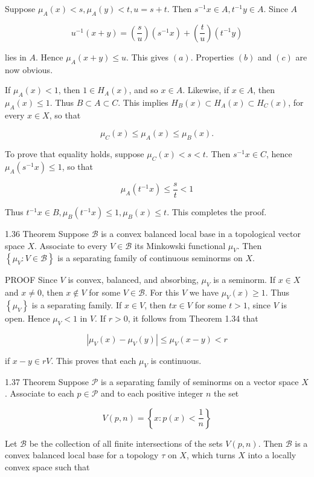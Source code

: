 \documentclass[10pt]{article}
\begin{document}
Suppose $\mu_{A}(x)<s, \mu_{A}(y)<t, u=s+t$. Then $s^{-1} x \in A, t^{-1} y \in A$. Since $A$

$$
u^{-1}(x+y)=\left(\frac{s}{u}\right)\left(s^{-1} x\right)+\left(\frac{t}{u}\right)\left(t^{-1} y\right)
$$

lies in $A$. Hence $\mu_{A}(x+y) \leq u$. This gives $(a)$. Properties $(b)$ and $(c)$ are now obvious.

If $\mu_{A}(x)<1$, then $1 \in H_{A}(x)$, and so $x \in A$. Likewise, if $x \in A$, then $\mu_{A}(x) \leq 1$. Thus $B \subset A \subset C$. This implies $H_{B}(x) \subset H_{A}(x) \subset H_{C}(x)$, for every $x \in X$, so that

$$
\mu_{C}(x) \leq \mu_{A}(x) \leq \mu_{B}(x) .
$$

To prove that equality holds, suppose $\mu_{C}(x)<s<t$. Then $s^{-1} x \in C$, hence $\mu_{A}\left(s^{-1} x\right) \leq 1$, so that

$$
\mu_{A}\left(t^{-1} x\right) \leq \frac{s}{t}<1
$$

Thus $t^{-1} x \in B, \mu_{B}\left(t^{-1} x\right) \leq 1, \mu_{B}(x) \leq t$. This completes the proof.

1.36 Theorem Suppose $\mathscr{B}$ is a convex balanced local base in a topological vector space $X$. Associate to every $V \in \mathscr{B}$ its Minkowski functional $\mu_{V}$. Then $\left\{\mu_{V}: V \in \mathscr{B}\right\}$ is a separating family of continuous seminorms on $X$.

PROOF Since $V$ is convex, balanced, and absorbing, $\mu_{V}$ is a seminorm. If $x \in X$ and $x \neq 0$, then $x \notin V$ for some $V \in \mathscr{B}$. For this $V$ we have $\mu_{V}(x) \geq 1$. Thus $\left\{\mu_{V}\right\}$ is a separating family. If $x \in V$, then $t x \in V$ for some $t>1$, since $V$ is open. Hence $\mu_{V}<1$ in $V$. If $r>0$, it follows from Theorem 1.34 that

$$
\left|\mu_{V}(x)-\mu_{V}(y)\right| \leq \mu_{V}(x-y)<r
$$

if $x-y \in r V$. This proves that each $\mu_{V}$ is continuous.

1.37 Theorem Suppose $\mathscr{P}$ is a separating family of seminorms on a vector space $X$. Associate to each $p \in \mathscr{P}$ and to each positive integer $n$ the set

$$
V(p, n)=\left\{x: p(x)<\frac{1}{n}\right\}
$$

Let $\mathscr{B}$ be the collection of all finite intersections of the sets $V(p, n)$. Then $\mathscr{B}$ is a convex balanced local base for a topology $\tau$ on $X$, which turns $X$ into a locally convex space such that
\end{document}
